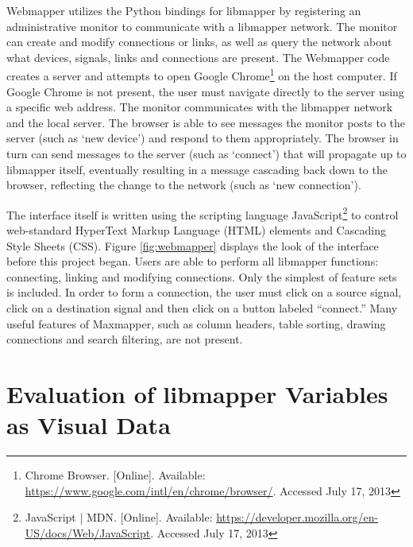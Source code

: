 Webmapper utilizes the Python bindings for libmapper by registering an administrative monitor to communicate with a libmapper network. The monitor can create and modify connections or links, as well as query the network about what devices, signals, links and connections are present. The Webmapper code creates a server and attempts to open Google Chrome\footnote{Chrome Browser. [Online]. Available: \url{https://www.google.com/intl/en/chrome/browser/}. Accessed July 17, 2013} on the host computer. If Google Chrome is not present, the user must navigate directly to the server using a specific web address. The monitor communicates with the libmapper network and the local server. The browser is able to see messages the monitor posts to the server (such as `new device') and respond to them appropriately. The browser in turn can send messages to the server (such as `connect') that will propagate up to libmapper itself, eventually resulting in a message cascading back down to the browser, reflecting the change to the network (such as `new connection'). 

The interface itself is written using the scripting language JavaScript\footnote{JavaScript | MDN. [Online]. Available: \url{https://developer.mozilla.org/en-US/docs/Web/JavaScript}. Accessed July 17, 2013} to control web-standard HyperText Markup Language (HTML) elements and Cascading Style Sheets (CSS). Figure \ref{fig:webmapper} displays the look of the interface before this project began. Users are able to perform all libmapper functions: connecting, linking and modifying connections. Only the simplest of feature sets is included. In order to form a connection, the user must click on a source signal, click on a destination signal and then click on a button labeled ``connect.'' Many useful features of Maxmapper, such as column headers, table sorting, drawing connections and search filtering, are not present.



\section{Evaluation of libmapper Variables as Visual Data} %
\label{sec:evaluation_of_libmapper_variables}

